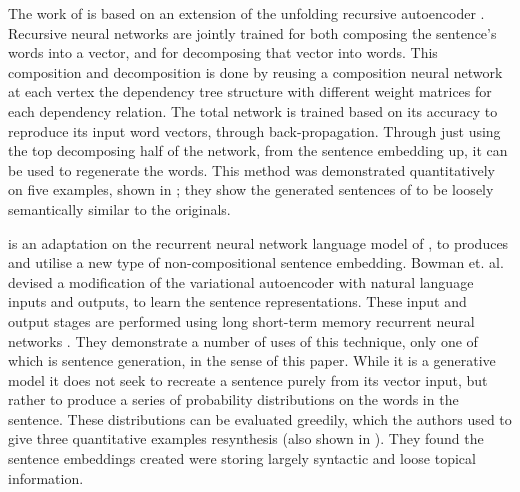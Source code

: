 \documentclass[11pt]{article}
\theoremstyle{plain}
\theoremstyle{definition}
\begin{document}
The work of \textcite{iyyer2014generating} is based on an extension of the unfolding recursive autoencoder \textcite{SocherEtAl2011:PoolRAE}. Recursive neural networks are jointly trained for both composing the sentence's words into a vector, and for decomposing that vector into words. This composition and decomposition is done by reusing a composition neural network at each vertex the  dependency tree structure with different weight matrices for each dependency relation. The total network is trained based on its accuracy to reproduce its input word vectors, through back-propagation. Through just using the top decomposing half of the network, from the sentence embedding up, it can be used to regenerate the words. This method was demonstrated quantitatively on five examples, shown in ; they show the generated sentences of \textcite{iyyer2014generating} to be loosely semantically similar to the originals.




\textcite{Bowman2015SmoothGeneration} is an adaptation on the recurrent neural network language model of \textcite{mikolov2011RnnLM}, to produces and utilise a new type of non-compositional sentence embedding. Bowman et. al. devised a modification of the variational autoencoder  \parencite{kingma2013auto} with natural language inputs and outputs, to learn the sentence representations. These input and output stages are performed using long short-term memory recurrent neural networks \parencite{hochreiter1997long}. They demonstrate a number of uses of this technique, only one of which is sentence generation, in the sense of this paper.
While it is a generative model it does not seek to recreate a sentence purely from its vector input, but rather to produce a series of probability distributions on the words in the sentence. These distributions can be evaluated greedily, which the authors used to give three quantitative examples resynthesis (also shown in ). They found the sentence embeddings created were storing largely syntactic and loose topical information. 
\end{document}

